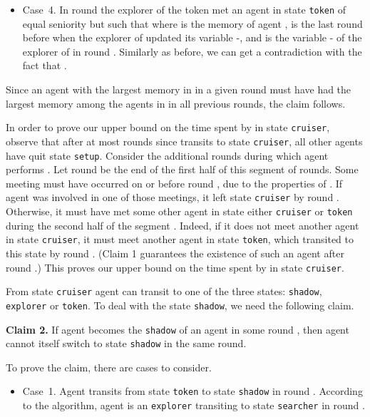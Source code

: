 \documentclass[11pt]{article}
\newcommand{\finclaim}{\hfill }
\newcommand{\qed}{\hfill  \bigbreak}
\newenvironment{proof}{\noindent {\bf Proof.}}{\qed}
\begin{document}
\begin{proof}
\begin{itemize}
\item{ {Case~4.} In round  the explorer of the token  met an agent  in state {\tt token} of equal seniority but such that  where  is the memory of agent ,  is the last round before  when the explorer of  updated its variable -, and  is the variable - of the explorer of  in round . Similarly as before, we can get a contradiction with the fact that .}

\end{itemize}

Since an agent with the largest memory {in } in a given round must have had the largest memory among the agents in  in all previous rounds, the claim follows. \finclaim

In order to prove our upper bound on the time spent by  in state {\tt cruiser}, observe that
after at most { rounds} since  transits to state {\tt cruiser}, all other agents have quit state {\tt setup}. 
Consider the additional  rounds during which agent  performs . Let round  be the end of the first half
of this segment  of   rounds. Some meeting must have occurred on or before round , due to the properties of .
If agent  was involved in one of those meetings, it left state {\tt cruiser} by round . Otherwise, it must have met some other agent
in state either {\tt cruiser} or {\tt token} during the second half of the segment . Indeed, if it does not meet another agent in state {\tt cruiser},
it must meet another agent in state {\tt token}, which transited to this state by round . (Claim 1 guarantees the existence of such an 
agent after round .) This proves our upper bound on the time spent by  in state {\tt cruiser}.

From state {\tt cruiser} agent  can transit to one of the three states: {\tt shadow}, {\tt explorer} or {\tt token}. {To deal with the state {\tt shadow}, we need the following claim.}

\vspace*{0.3cm}
\noindent
{{\bf Claim 2.} If agent  becomes the {\tt shadow} of an agent  in some round , then agent  cannot itself switch to state {\tt shadow} in the same round.}


{To prove the claim, there are  cases to consider.}

\begin{itemize}
\item{ {Case~1.} Agent  transits from state {\tt token} to state {\tt shadow} in round . According to the algorithm, agent  is an 
{\tt explorer} transiting to state {\tt searcher} in round .}


\end{itemize}
\end{proof}
\end{document}

